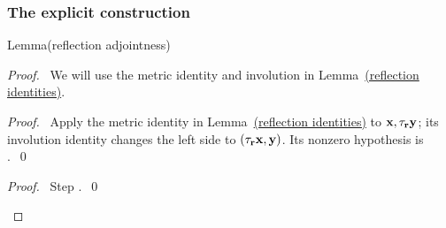 \begin{mergedproofsection}
\subsubsection{The explicit construction}

\begin{namedresult}{Lemma}{(reflection adjointness)}\label{lem:312-reflection}
\end{namedresult}
\begin{proof}
\pfsketch\ We will use the metric identity and involution in
Lemma~\hyperref[lem:rem-reflection]{(reflection identities)}.
\begin{proof}\pf\ Apply the metric identity in Lemma~\hyperref[lem:rem-reflection]{(reflection identities)}
to ${\mathbf x},\tau_{{\mathbf r}}{\mathbf y}$; its involution identity changes the left side to
$(\tau_{{\mathbf r}}{\mathbf x},{\mathbf y})$. Its nonzero hypothesis is .~\qed\end{proof}
\qedstep
\begin{proof}\pf\ Step .~\qed\end{proof}
\end{proof}


\end{mergedproofsection}
